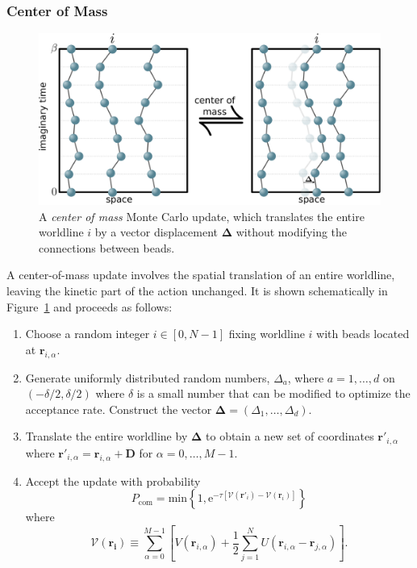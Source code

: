 \documentclass[prb,10pt,aps,floatfix,notitlepage]{revtex4-1}
\renewcommand{\vec}[1]{\boldsymbol{#1}}
\newcommand{\e}[1]{\mathrm{e}^{#1}}
\begin{document}
\subsubsection{Center of Mass}
%
\begin{figure}
\begin{center}
\includegraphics[width=0.70\columnwidth]{Figures/centerofmass.pdf}
\end{center}
\caption{A \emph{center of mass} Monte Carlo update, which translates the entire
worldline $i$ by a vector displacement $\vec{\Delta}$ without modifying the
connections between beads.}
\label{fig:com}
 \end{figure}
%
A center-of-mass update involves the spatial translation of an entire
worldline, leaving the kinetic part of the action unchanged.  It is shown
schematically in Figure~\ref{fig:com} and proceeds as
follows:
\begin{enumerate}
    \item Choose a random integer $i \in [0,N-1]$ fixing worldline $i$ with beads located
        at $\vec{r}_{i,\alpha}$.
    \item Generate uniformly distributed random numbers, $\Delta_a$, where
        $a=1,\ldots,d$ on $(-\delta/2,\delta/2)$ where $\delta$ is a small number that can be
    modified to optimize the acceptance rate. Construct the vector $\vec{\Delta} =
    (\Delta_1,\ldots,\Delta_d)$.
\item Translate the entire worldline by $\vec{\Delta}$ to obtain a new set of
coordinates $\vec{r}'_{i,\alpha}$ where  $\vec{r}'_{i,\alpha} =
\vec{r}_{i,\alpha} + \vec{D}$ for $\alpha = 0,\ldots,M-1$.
\item Accept the update with probability
\begin{equation}
    P_{\text{com}} = \mathrm{min} 
    \left\{1,\e{-\tau[\mathcal{V}(\vec{r}'_i)-\mathcal{V}(\vec{r}_i)]} \right\}
\end{equation}
%
where 
%
\begin{equation}
    \mathcal{V}(\vec{r_i}) \equiv \sum_{\alpha=0}^{M-1}\left[ V(\vec{r}_{i,\alpha}) + \frac{1}{2}\sum_{j=1}^{N}
    U(\vec{r}_{i,\alpha}-\vec{r}_{j,\alpha})\right].
\end{equation}
%
\end{enumerate}
\end{document}
